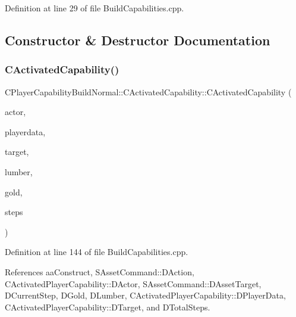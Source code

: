 Definition at line 29 of file Build\+Capabilities.\+cpp.



\subsection{Constructor \& Destructor Documentation}
\hypertarget{classCPlayerCapabilityBuildNormal_1_1CActivatedCapability_a33a64e3a38d5e2e3c705d3350780a17a}{}\label{classCPlayerCapabilityBuildNormal_1_1CActivatedCapability_a33a64e3a38d5e2e3c705d3350780a17a} 
\subsubsection{\texorpdfstring{C\+Activated\+Capability()}{CActivatedCapability()}}
{\footnotesize\ttfamily C\+Player\+Capability\+Build\+Normal\+::\+C\+Activated\+Capability\+::\+C\+Activated\+Capability (\begin{DoxyParamCaption}\item[{std\+::shared\+\_\+ptr$<$ \hyperlink{classCPlayerAsset}{C\+Player\+Asset} $>$}]{actor,  }\item[{std\+::shared\+\_\+ptr$<$ \hyperlink{classCPlayerData}{C\+Player\+Data} $>$}]{playerdata,  }\item[{std\+::shared\+\_\+ptr$<$ \hyperlink{classCPlayerAsset}{C\+Player\+Asset} $>$}]{target,  }\item[{int}]{lumber,  }\item[{int}]{gold,  }\item[{int}]{steps }\end{DoxyParamCaption})}



Definition at line 144 of file Build\+Capabilities.\+cpp.



References aa\+Construct, S\+Asset\+Command\+::\+D\+Action, C\+Activated\+Player\+Capability\+::\+D\+Actor, S\+Asset\+Command\+::\+D\+Asset\+Target, D\+Current\+Step, D\+Gold, D\+Lumber, C\+Activated\+Player\+Capability\+::\+D\+Player\+Data, C\+Activated\+Player\+Capability\+::\+D\+Target, and D\+Total\+Steps.


